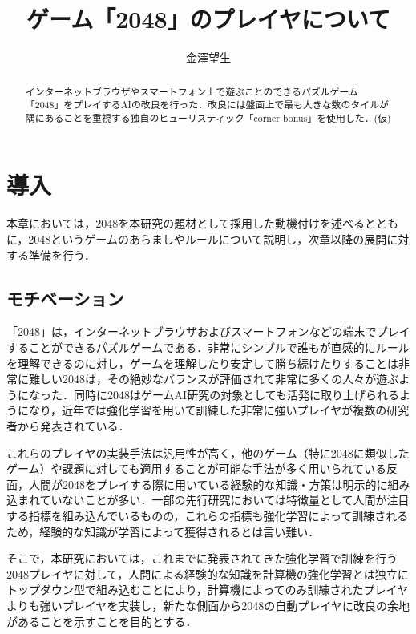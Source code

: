 \documentclass{suribt}
\title{ゲーム「2048」のプレイヤについて}
\author{金澤望生}
\begin{document}
\maketitle

\frontmatter
\begin{abstract}
インターネットブラウザやスマートフォン上で遊ぶことのできるパズルゲーム「2048」をプレイするAIの改良を行った．改良には盤面上で最も大きな数のタイルが隅にあることを重視する独自のヒューリスティック「corner bonus」を使用した．(仮)
\end{abstract}

\tableofcontents

\mainmatter
\chapter{導入}
本章においては，2048を本研究の題材として採用した動機付けを述べるとともに，2048というゲームのあらましやルールについて説明し，次章以降の展開に対する準備を行う．

\section{モチベーション}
「2048」\cite{2048game}は，インターネットブラウザおよびスマートフォンなどの端末でプレイすることができるパズルゲームである．非常にシンプルで誰もが直感的にルールを理解できるのに対し，ゲームを理解したり安定して勝ち続けたりすることは非常に難しい\cite{Szubert}2048は，その絶妙なバランスが評価されて非常に多くの人々が遊ぶようになった．同時に2048はゲームAI研究の対象としても活発に取り上げられるようになり，近年では強化学習を用いて訓練した非常に強いプレイヤが複数の研究者から発表されている．\cite{Szubert}\cite{Wu}\cite{Oka}\cite{Yeh}\cite{Jaskowski}

これらのプレイヤの実装手法は汎用性が高く，他のゲーム（特に2048に類似したゲーム）や課題に対しても適用することが可能な手法が多く用いられている\cite{Yeh}反面，人間が2048をプレイする際に用いている経験的な知識・方策は明示的に組み込まれていないことが多い．一部の先行研究においては特徴量として人間が注目する指標を組み込んでいる\cite{Yeh}ものの，これらの指標も強化学習によって訓練されるため，経験的な知識が学習によって獲得されるとは言い難い．

そこで，本研究においては，これまでに発表されてきた強化学習で訓練を行う2048プレイヤに対して，人間による経験的な知識を計算機の強化学習とは独立にトップダウン型で組み込むことにより，計算機によってのみ訓練されたプレイヤよりも強いプレイヤを実装し，新たな側面から2048の自動プレイヤに改良の余地があることを示すことを目的とする．
\end{document}
